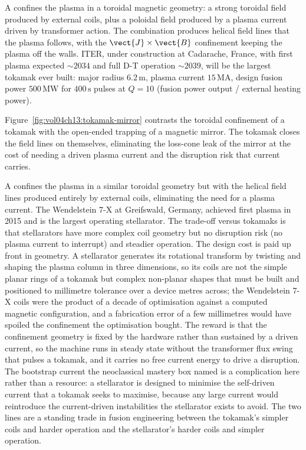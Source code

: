 A  confines the plasma in a toroidal magnetic
geometry: a strong toroidal field produced by external coils, plus a
poloidal field produced by a plasma current driven by transformer
action. The combination produces helical field lines that the plasma
follows, with the $\vect{J}\times \vect{B}$ confinement keeping the
plasma off the walls. ITER, under construction at Cadarache, France,
with first plasma expected $\sim 2034$ and full D-T operation $\sim
2039$, will be the largest tokamak ever built: major radius $6.2\,\si{
\meter}$, plasma current $15\,\si{\mega\ampere}$, design fusion power
$500\,\si{\mega\watt}$ for $400\,\si{\second}$ pulses at $Q = 10$
(fusion power output / external heating power).



Figure~\ref{fig:vol04ch13:tokamak-mirror} contrasts the toroidal
confinement of a tokamak with the open-ended trapping of a magnetic
mirror. The tokamak closes the field lines on themselves, eliminating the
loss-cone leak of the mirror at the cost of needing a driven plasma
current and the disruption risk that current carries.

A  confines the plasma in a similar toroidal
geometry but with the helical field lines produced entirely by
external coils, eliminating the need for a plasma current. The
Wendelstein 7-X at Greifswald, Germany, achieved first plasma in
2015 and is the largest operating stellarator. The trade-off versus
tokamaks is that stellarators have more complex coil geometry but no
disruption risk (no plasma current to interrupt) and steadier
operation. The design cost is paid up front in geometry. A stellarator
generates its rotational transform by twisting and shaping the plasma
column in three dimensions, so its coils are not the simple planar rings
of a tokamak but complex non-planar shapes that must be built and
positioned to millimetre tolerance over a device metres across; the
Wendelstein 7-X coils were the product of a decade of optimisation
against a computed magnetic configuration, and a fabrication error of a
few millimetres would have spoiled the confinement the optimisation
bought. The reward is that the confinement geometry is fixed by the
hardware rather than sustained by a driven current, so the machine runs
in steady state without the transformer flux swing that pulses a
tokamak, and it carries no free current energy to drive a disruption.
The bootstrap current the neoclassical mastery box named is a
complication here rather than a resource: a stellarator is designed to
minimise the self-driven current that a tokamak seeks to maximise,
because any large current would reintroduce the current-driven
instabilities the stellarator exists to avoid. The two lines are a
standing trade in fusion engineering between the tokamak's simpler coils
and harder operation and the stellarator's harder coils and simpler
operation.

